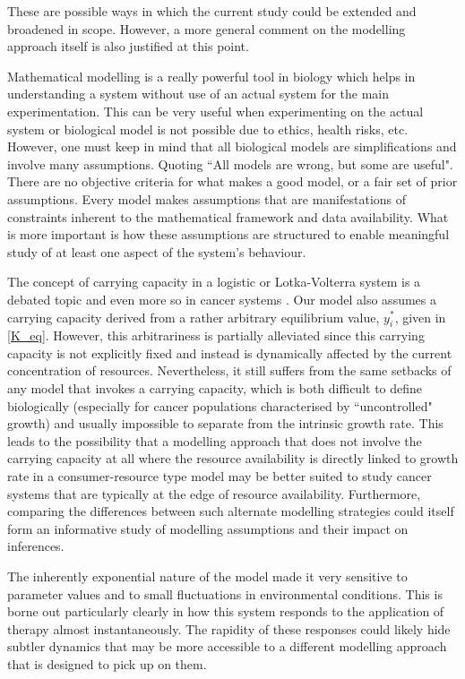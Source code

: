 These are possible ways in which the current study could be extended and broadened in scope. However, a more general comment on the modelling approach itself is also justified at this point.

Mathematical modelling is a really powerful tool in biology which helps in understanding a system without use of an actual system for the main experimentation. This can be very useful when experimenting on the actual system or biological model is not possible due to ethics, health risks, etc. However, one must keep in mind that all biological models are simplifications and involve many assumptions. Quoting \cite{Box} ``All models are wrong, but some are useful". There are no objective criteria for what makes a good model, or a fair set of prior assumptions. Every model makes assumptions that are manifestations of constraints inherent to the mathematical framework and data availability. What is more important is how these assumptions are structured to enable meaningful study of at least one aspect of the system’s behaviour.

The concept of carrying capacity in a logistic or Lotka-Volterra system is a debated topic and even more so in cancer systems \cite{McLeod,Deisboeck}. Our model also assumes a carrying capacity derived from a rather arbitrary equilibrium value, $y_i^*$, given in \autoref{K_eq}. However, this arbitrariness is partially alleviated since this carrying capacity is not explicitly fixed and instead is dynamically affected by the current concentration of resources. Nevertheless, it still suffers from the same setbacks of any model that invokes a carrying capacity, which is both difficult to define biologically (especially for cancer populations characterised by ``uncontrolled" growth) and usually impossible to separate from the intrinsic growth rate. This leads to the possibility that a modelling approach that does not involve the carrying capacity at all where the resource availability is directly linked to growth rate in a consumer-resource type model may be better suited to study cancer systems that are typically at the edge of resource availability. Furthermore, comparing the differences between such alternate modelling strategies could itself form an informative study of modelling assumptions and their impact on inferences.

The inherently exponential nature of the model made it very sensitive to parameter values and to small fluctuations in environmental conditions. This is borne out particularly clearly in how this system responds to the application of therapy almost instantaneously. The rapidity of these responses could likely hide subtler dynamics that may be more accessible to a different modelling approach that is designed to pick up on them.

